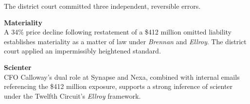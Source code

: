 \documentclass[12pt]{article}
\begin{document}
The district court committed three independent, reversible errors.

\vspace{8pt}

\noindent\begin{minipage}[t]{0.48\textwidth}
\begin{tcolorbox}[authoritybox, height=5.6cm]
  \begin{center}
  \end{center}
  \vspace{4pt}
  {\small\color{NavyDeep}\bfseries Materiality}\\[4pt]
  {\small\color{SlateGrey}
  A 34\% price decline following restatement of a \$412 million omitted liability
  establishes materiality as a matter of law under \textit{Brennan} and \textit{Ellroy}.
  The district court applied an impermissibly heightened standard.}
\end{tcolorbox}
\end{minipage}
\hfill
\begin{minipage}[t]{0.48\textwidth}
\begin{tcolorbox}[authoritybox, height=5.6cm]
  \begin{center}
  \end{center}
  \vspace{4pt}
  {\small\color{NavyDeep}\bfseries Scienter}\\[4pt]
  {\small\color{SlateGrey}
  CFO Calloway's dual role at Synapse and Nexa, combined with internal emails
  referencing the \$412 million exposure, supports a strong inference of scienter
  under the Twelfth Circuit's \textit{Ellroy} framework.}
\end{tcolorbox}
\end{minipage}

\par
\vspace{12pt}
\end{document}
